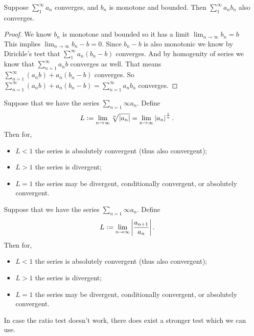 \documentclass[11pt,a4paper]{article}
\begin{document}
  \begin{proposition}
	Suppose $\sum_{1}^{\infty}{a_n}$ converges, and $b_n$ is monotone and bounded.
    Then $\sum_{1}^{\infty}{a_nb_n}$ also converges.
  \end{proposition}
	\begin{proof}
		We know $b_n$ is monotone and bounded so it has a limit $\lim_{n\to\infty}{b_n}=b$
		This implies $\lim_{n\to\infty}{b_n-b}=0$. 
		Since $b_n-b$ is also monotonic we know by Dirichle's test that 
		$\sum_{1}^{\infty}{a_n(b_n-b)}$ converges. And by homogenity of series we know that
		 $\sum_{n=1}^{\infty}{a_n b}$ converges as well.
		That means $\sum_{n=1}^{\infty}{(a_n b)+a_n(b_n-b)}$ converges.
		So $\sum_{n=1}^{\infty}{(a_n b)+a_n(b_n-b)} = \sum_{n=1}^{\infty}{a_nb_n}$
    converges.
	\end{proof}

  \begin{proposition}
    Suppose that we have the series $\sum_{n=1}{\infty} a_n$.
    Define
    \[
      L :=
      \lim_{n \to \infty} \sqrt[n]{\left\lvert a_n\right\rvert} =
      \lim_{n \to \infty} \left\lvert a_n\right\rvert^{\frac{1}{n}}.
    \]
    Then for,
    \begin{itemize}
      \item $L < 1$ the series is absolutely convergent (thus also convergent);
      \item $L > 1$ the series is divergent;
      \item $L = 1$ the series may be divergent, conditionally convergent,
        or absolutely convergent.
    \end{itemize}
  \end{proposition}
  
  \begin{proposition}
    Suppose that we have the series $\sum_{n=1}{\infty} a_n$.
    Define
    \[
      L :=
      \lim_{n \to \infty} \left\lvert\frac{a_{n+1}}{a_{n}}\right\rvert.
    \]
    Then for,
    \begin{itemize}
      \item $L < 1$ the series is absolutely convergent (thus also convergent);
      \item $L > 1$ the series is divergent;
      \item $L = 1$ the series may be divergent, conditionally convergent,
        or absolutely convergent.
    \end{itemize}
  \end{proposition}

  In case the ratio test doesn't work, there does exist a stronger
  test which we can use.
  
\end{document}
